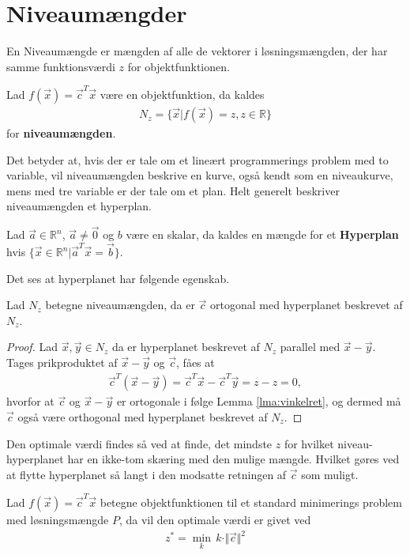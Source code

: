 \section{Niveaumængder}
En Niveaumængde er mængden af alle de vektorer i løsningsmængden, der har samme funktionsværdi $z$ for objektfunktionen.
\begin{defn}[Niveaumængden]
Lad $f(\vec{x})= \vec{c}^T\vec{x}$ være en objektfunktion, da kaldes
\begin{align*}
N_z = \{\vec{x}| f(\vec{x}) = z, z \in \mathds{R}\}
\end{align*}
for \textbf{niveaumængden}.
\end{defn}
Det betyder at, hvis der er tale om et lineært programmerings problem med to variable, vil niveaumængden beskrive en kurve, også kendt som en niveaukurve, mens med tre variable er der tale om et plan. 
Helt generelt beskriver niveaumængden et hyperplan.
\begin{defn}[Hyperplan]
Lad $ \vec{a} \in \mathds{R}^n$, $\vec{a}\neq \vec{0}$ og $b$ være en skalar, da kaldes en mængde for et \textbf{Hyperplan} hvis $\{ \vec{x} \in \mathds{R}^n | \vec{a}^{T}\vec{x} = \vec{b}\}$.
\end{defn}
Det ses at hyperplanet har følgende egenskab.
\begin{stn}
Lad $N_z$ betegne niveaumængden, da er $\vec{c}$ ortogonal med hyperplanet beskrevet af $N_z$.
\end{stn}
\begin{proof}
Lad $\vec{x}, \vec{y} \in N_z$ da er hyperplanet beskrevet af $N_z$ parallel med $\vec{x}-\vec{y}$.
Tages prikproduktet af $\vec{x}-\vec{y}$ og $\vec{c}$, fåes at
\begin{align*}
\vec{c}^T(\vec{x}-\vec{y}) = \vec{c}^T\vec{x} -\vec{c}^T\vec{y} = z - z = 0,
\end{align*}
hvorfor at $\vec{c}$ og $\vec{x}-\vec{y}$ er ortogonale i følge Lemma \ref{lma:vinkelret}, og dermed må $\vec{c}$ også være orthogonal med hyperplanet beskrevet af $N_z$.
\end{proof}
Den optimale værdi findes så ved at finde, det mindste $z$ for hvilket niveau-hyperplanet har en ikke-tom skæring med den mulige mængde. 
Hvilket gøres ved at flytte hyperplanet så langt i den modsatte retningen af $\vec{c}$ som muligt.
\begin{stn}
Lad $f(\vec{x})=\vec{c}^T\vec{x}$ betegne objektfunktionen til et standard minimerings problem med løsningsmængde $P$, da vil den 
optimale værdi er givet ved
\begin{align*}
z^* = \underset{k}{\min} \, k \cdot \Vert \vec{c} \Vert ^2
\end{align*}
\label{stn:niveau}
\end{stn}
